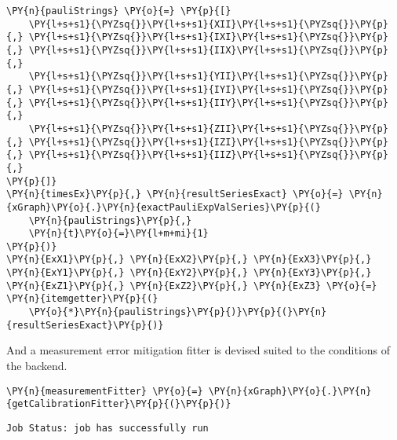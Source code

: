     \begin{tcolorbox}[breakable, size=fbox, boxrule=1pt, pad at break*=1mm,colback=cellbackground, colframe=cellborder]
\begin{Verbatim}[commandchars=\\\{\}]
\PY{n}{pauliStrings} \PY{o}{=} \PY{p}{[}
    \PY{l+s+s1}{\PYZsq{}}\PY{l+s+s1}{XII}\PY{l+s+s1}{\PYZsq{}}\PY{p}{,} \PY{l+s+s1}{\PYZsq{}}\PY{l+s+s1}{IXI}\PY{l+s+s1}{\PYZsq{}}\PY{p}{,} \PY{l+s+s1}{\PYZsq{}}\PY{l+s+s1}{IIX}\PY{l+s+s1}{\PYZsq{}}\PY{p}{,} 
    \PY{l+s+s1}{\PYZsq{}}\PY{l+s+s1}{YII}\PY{l+s+s1}{\PYZsq{}}\PY{p}{,} \PY{l+s+s1}{\PYZsq{}}\PY{l+s+s1}{IYI}\PY{l+s+s1}{\PYZsq{}}\PY{p}{,} \PY{l+s+s1}{\PYZsq{}}\PY{l+s+s1}{IIY}\PY{l+s+s1}{\PYZsq{}}\PY{p}{,}
    \PY{l+s+s1}{\PYZsq{}}\PY{l+s+s1}{ZII}\PY{l+s+s1}{\PYZsq{}}\PY{p}{,} \PY{l+s+s1}{\PYZsq{}}\PY{l+s+s1}{IZI}\PY{l+s+s1}{\PYZsq{}}\PY{p}{,} \PY{l+s+s1}{\PYZsq{}}\PY{l+s+s1}{IIZ}\PY{l+s+s1}{\PYZsq{}}\PY{p}{,}
\PY{p}{]}
\PY{n}{timesEx}\PY{p}{,} \PY{n}{resultSeriesExact} \PY{o}{=} \PY{n}{xGraph}\PY{o}{.}\PY{n}{exactPauliExpValSeries}\PY{p}{(}
    \PY{n}{pauliStrings}\PY{p}{,}
    \PY{n}{t}\PY{o}{=}\PY{l+m+mi}{1}
\PY{p}{)}
\PY{n}{ExX1}\PY{p}{,} \PY{n}{ExX2}\PY{p}{,} \PY{n}{ExX3}\PY{p}{,} \PY{n}{ExY1}\PY{p}{,} \PY{n}{ExY2}\PY{p}{,} \PY{n}{ExY3}\PY{p}{,} \PY{n}{ExZ1}\PY{p}{,} \PY{n}{ExZ2}\PY{p}{,} \PY{n}{ExZ3} \PY{o}{=} \PY{n}{itemgetter}\PY{p}{(}
    \PY{o}{*}\PY{n}{pauliStrings}\PY{p}{)}\PY{p}{(}\PY{n}{resultSeriesExact}\PY{p}{)}
\end{Verbatim}
\end{tcolorbox}

    And a measurement error mitigation fitter is devised suited to the
conditions of the backend.

    \begin{tcolorbox}[breakable, size=fbox, boxrule=1pt, pad at break*=1mm,colback=cellbackground, colframe=cellborder]
\begin{Verbatim}[commandchars=\\\{\}]
\PY{n}{measurementFitter} \PY{o}{=} \PY{n}{xGraph}\PY{o}{.}\PY{n}{getCalibrationFitter}\PY{p}{(}\PY{p}{)} 
\end{Verbatim}
\end{tcolorbox}

    \begin{Verbatim}[commandchars=\\\{\}]
Job Status: job has successfully run
    \end{Verbatim}

